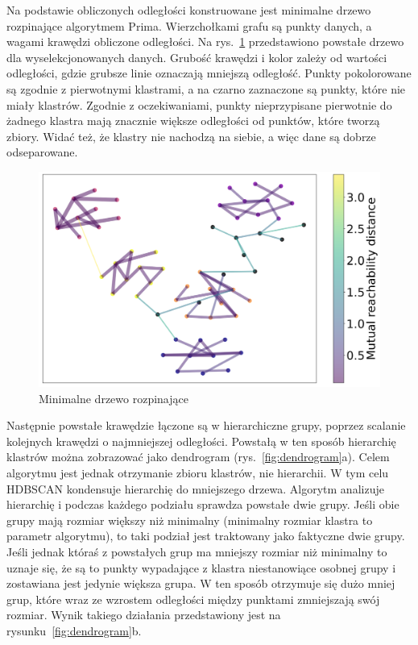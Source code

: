 	Na podstawie obliczonych odległości konstruowane jest minimalne drzewo rozpinające algorytmem Prima.
	Wierzchołkami grafu są punkty danych, a wagami krawędzi obliczone odległości.
	Na rys.~\ref{fig:mst} przedstawiono powstałe drzewo dla wyselekcjonowanych danych.
	Grubość krawędzi i kolor zależy od wartości odległości, gdzie grubsze linie oznaczają mniejszą odległość.
	Punkty pokolorowane są zgodnie z pierwotnymi klastrami, a na czarno zaznaczone są punkty, które nie miały klastrów.
	Zgodnie z oczekiwaniami, punkty nieprzypisane pierwotnie do żadnego klastra mają znacznie większe odległości od punktów, które tworzą zbiory.
	Widać też, że klastry nie nachodzą na siebie, a więc dane są dobrze odseparowane.
	
	\begin{figure}[htb]
		\centering
		\includegraphics[width=0.5\linewidth]{rys04/hdbscan_mst.png}
		\caption{Minimalne drzewo rozpinające}\label{fig:mst}
	\end{figure}
	
	Następnie powstałe krawędzie łączone są w hierarchiczne grupy, poprzez scalanie kolejnych krawędzi o najmniejszej odległości.
	Powstałą w ten sposób hierarchię klastrów można zobrazować jako dendrogram (rys.~\ref{fig:dendrogram}a).
	Celem algorytmu jest jednak otrzymanie zbioru klastrów, nie hierarchii.
	W tym celu HDBSCAN kondensuje hierarchię do mniejszego drzewa.
	Algorytm analizuje hierarchię i podczas każdego podziału sprawdza powstałe dwie grupy.
	Jeśli obie grupy mają rozmiar większy niż minimalny (minimalny rozmiar klastra to parametr algorytmu),
		to taki podział jest traktowany jako faktyczne dwie grupy.
	Jeśli jednak któraś z powstałych grup ma mniejszy rozmiar niż minimalny to uznaje się,
		że są to punkty wypadające z klastra niestanowiące osobnej grupy i zostawiana jest jedynie większa grupa.
	W ten sposób otrzymuje się dużo mniej grup, które wraz ze wzrostem odległości między punktami zmniejszają swój rozmiar.
	Wynik takiego działania przedstawiony jest na rysunku~\ref{fig:dendrogram}b.
	
